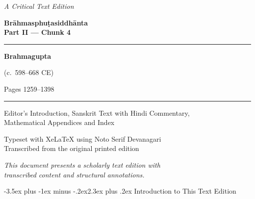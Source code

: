 \documentclass[11pt,a4paper]{article}
\makeatletter
\renewcommand{\section}{\@startsection {section}{1}{\z@}%
  {-3.5ex plus -1ex minus -.2ex}{2.3ex plus .2ex}%
  {\normalfont\Large\bfseries\color{sectioncolor}}}
\newcommand{\longline}{\noindent\rule{\textwidth}{0.4pt}}
\makeatother
\begin{document}
\thispagestyle{empty}
\begin{center}
\vspace*{3cm}

{\fontsize{14}{18}\selectfont\textit{A Critical Text Edition}}

\vspace{1.5cm}

{\fontsize{22}{28}\selectfont\bfseries\color{titlecolor}
Brāhmasphuṭasiddhānta\\[0.5em]
{\large Part II --- Chunk 4}}

\vspace{1cm}

\longline

\vspace{1cm}

{\LARGE\bfseries Brahmagupta}

\vspace{0.5cm}

{\large (c.\ 598--668 CE)}

\vspace{2cm}

{\large Pages 1259--1398}

\vspace{1cm}

\longline

\vspace{1.5cm}

{\large Editor's Introduction, Sanskrit Text with Hindi Commentary,\\
Mathematical Appendices and Index}

\vspace{2cm}

{\small\textcolor{sectioncolor}{Typeset with XeLaTeX using Noto Serif Devanagari\\
Transcribed from the original printed edition}}

\vspace{1cm}

{\small\textit{This document presents a scholarly text edition with\\
transcribed content and structural annotations.}}

\end{center}

\newpage

\tableofcontents
\newpage

\section{Introduction to This Text Edition}
\end{document}
